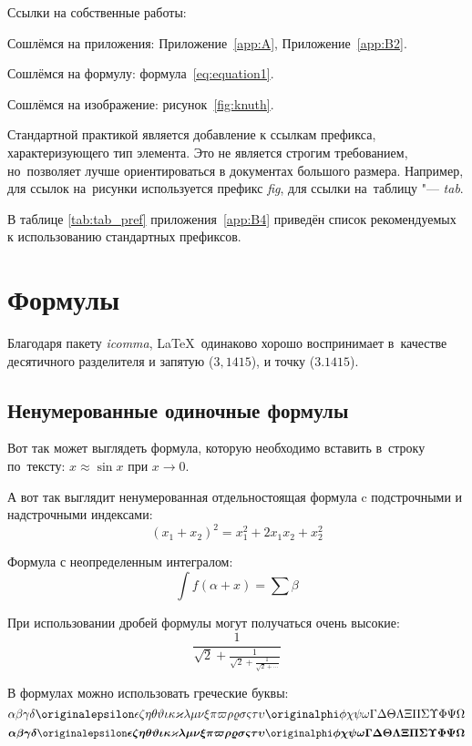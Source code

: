 Ссылки на собственные работы:~\cite{vakbib1, confbib1}

Сошлёмся на приложения: Приложение~\cref{app:A}, Приложение~\cref{app:B2}.

Сошлёмся на формулу: формула~\cref{eq:equation1}.

Сошлёмся на изображение: рисунок~\cref{fig:knuth}.

Стандартной практикой является добавление к ссылкам префикса, характеризующего тип элемента.
Это не является строгим требованием, но~позволяет лучше ориентироваться в документах большого размера.
Например, для ссылок на~рисунки используется префикс \textit{fig},
для ссылки на~таблицу "--- \textit{tab}.

В таблице \cref{tab:tab_pref} приложения~\cref{app:B4} приведён список рекомендуемых
к использованию стандартных префиксов.

\section{Формулы}\label{sec:ch1/sec3}

Благодаря пакету \textit{icomma}, \LaTeX~одинаково хорошо воспринимает
в~качестве десятичного разделителя и запятую (\(3,1415\)), и точку (\(3.1415\)).

\subsection{Ненумерованные одиночные формулы}\label{subsec:ch1/sec3/sub1}

Вот так может выглядеть формула, которую необходимо вставить в~строку
по~тексту: \(x \approx \sin x\) при \(x \to 0\).

А вот так выглядит ненумерованная отдельностоящая формула c подстрочными
и надстрочными индексами:
\[
(x_1+x_2)^2 = x_1^2 + 2 x_1 x_2 + x_2^2
\]

Формула с неопределенным интегралом:
\[
\int f(\alpha+x)=\sum\beta
\]

При использовании дробей формулы могут получаться очень высокие:
\[
  \frac{1}{\sqrt{2}+
  \displaystyle\frac{1}{\sqrt{2}+
  \displaystyle\frac{1}{\sqrt{2}+\cdots}}}
\]

В формулах можно использовать греческие буквы:
\[
\alpha\beta\gamma\delta\originalepsilon\epsilon\zeta\eta\theta%
\vartheta\iota\kappa\varkappa\lambda\mu\nu\xi\pi\varpi\rho\varrho%
\sigma\varsigma\tau\upsilon\originalphi\phi\chi\psi\omega\Gamma\Delta%
\Theta\Lambda\Xi\Pi\Sigma\Upsilon\Phi\Psi\Omega
\]
\[%
\boldsymbol{\alpha\beta\gamma\delta\originalepsilon\epsilon\zeta\eta%
\theta\vartheta\iota\kappa\varkappa\lambda\mu\nu\xi\pi\varpi\rho%
\varrho\sigma\varsigma\tau\upsilon\originalphi\phi\chi\psi\omega\Gamma%
\Delta\Theta\Lambda\Xi\Pi\Sigma\Upsilon\Phi\Psi\Omega}
\]

